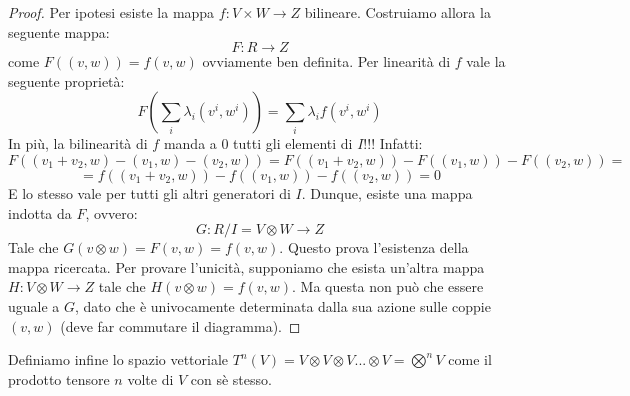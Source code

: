 \documentclass[12pt,a4paper]{report}
\theoremstyle{definition}
\theoremstyle{Theorem}
\theoremstyle{definition}
\theoremstyle{definition}
\theoremstyle{definition}
\begin{document}
	\begin{proof}
		Per ipotesi esiste la mappa $f:V\times W\rightarrow Z$ bilineare. Costruiamo allora la seguente mappa:
		$$F:R\rightarrow Z$$
		come $F((v,w))=f(v,w)$ ovviamente ben definita. Per linearità di $f$ vale la seguente proprietà:
		$$F(\sum_i \lambda_i(v^i,w^i))=\sum_{i}\lambda_if(v^i,w^i)$$
		In più, la bilinearità di $f$ manda a 0 tutti gli elementi di $I$!!!
		Infatti:
		$$F((v_1+v_2,w)-(v_1,w)-(v_2,w))=F((v_1+v_2,w))-F((v_1,w))-F((v_2,w))=$$
		$$=f((v_1+v_2,w))-f((v_1,w))-f((v_2,w))=0$$
		E lo stesso vale per tutti gli altri generatori di $I$. Dunque, esiste una mappa indotta da $F$, ovvero:
		$$G:R/I=V\otimes W\rightarrow Z$$
		Tale che $G(v\otimes w)=F(v,w)=f(v,w)$. Questo prova l'esistenza della mappa ricercata. Per provare l'unicità, supponiamo che esista un'altra mappa $H:V\otimes W\rightarrow Z$ tale che $H(v\otimes w)=f(v,w)$. Ma questa non può che essere uguale a $G$, dato che è univocamente determinata dalla sua azione sulle coppie $(v,w)$ (deve far commutare il diagramma).
	\end{proof}
	Definiamo infine lo spazio vettoriale $T^n(V)=V\otimes V\otimes V...\otimes V=\bigotimes^n V$ come il prodotto tensore $n$ volte di $V$ con sè stesso.
\end{document}
